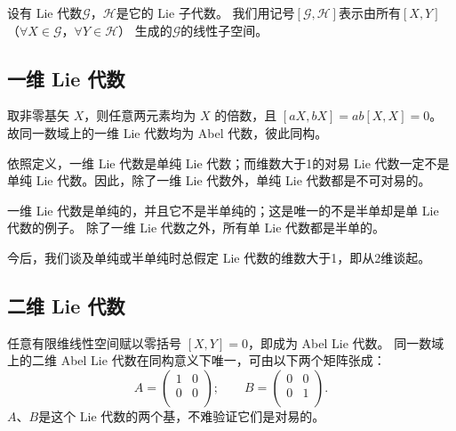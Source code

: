 设有 Lie 代数$\mathscr{G}$，$\mathscr{H}$是它的 Lie 子代数。
我们用记号$[\mathscr{G},\mathscr{H}]$表示由所有$[X,Y]$
（$\forall X\in \mathscr{G}$，$\forall Y\in\mathscr{H}$）
生成的$\mathscr{G}$的线性子空间。

\subsection{一维 Lie 代数}
取非零基矢 $X$，则任意两元素均为 $X$ 的倍数，且 $[aX,bX]=ab[X,X]=0$。
故同一数域上的一维 Lie 代数均为 Abel 代数，彼此同构。

依照定义，一维 Lie 代数是单纯 Lie 代数；而维数大于1的对易 Lie 代数一定不是
单纯 Lie 代数。因此，除了一维 Lie 代数外，单纯 Lie 代数都是不可对易的。

一维 Lie 代数是单纯的，并且它不是半单纯的；这是唯一的不是半单却是单 Lie 代数的例子。
除了一维 Lie 代数之外，所有单 Lie 代数都是半单的。

今后，我们谈及{单纯}或{半单纯}时总假定 Lie 代数的维数大于1，即从2维谈起。

\subsection{二维 Lie 代数}\label{chlg:sec_2DLA}

任意有限维线性空间赋以零括号 $[X,Y]=0$，即成为 Abel Lie 代数。
同一数域上的二维 Abel Lie 代数在同构意义下唯一，可由以下两个矩阵张成：
\begin{equation}
A=\left(
\begin{array}{cc}
    1 & 0 \\
    0 & 0 \\
\end{array}\right);\qquad
B=\left(
\begin{array}{cc}
    0 & 0 \\
    0 & 1 \\
\end{array}
\right).
\end{equation}
$A$、$B$是这个 Lie 代数的两个基，不难验证它们是对易的。

